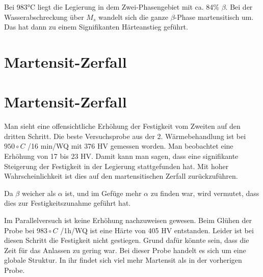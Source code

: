 Bei 983°C  liegt die Legierung in dem  Zwei-Phasengebiet mit ca. 84\% $\beta$. Bei der Wasserabschreckung über $M_s$ wandelt sich die ganze $\beta$-Phase martensitisch um. Das hat dann zu einem Signifikanten Härteanstieg geführt. 


\section{Martensit-Zerfall}

\section{Martensit-Zerfall}

Man sieht eine offensichtliche Erhöhung der Festigkeit vom Zweiten auf den dritten Schritt. Die beste Versuchsprobe aus der 2. Wärmebehandlung ist bei $950\circ C$ /16 min/WQ mit 376 HV gemessen worden. Man beobachtet eine Erhöhung von 17 bis 23 HV. Damit kann man sagen, dass eine signifikante Steigerung der Festigkeit in der Legierung stattgefunden hat. Mit hoher Wahrscheinlichkeit ist dies auf den martensitischen Zerfall zurückzuführen. 

Da $\beta$ weicher als $\alpha$ ist, und im Gefüge mehr $\alpha$ zu finden war, wird vermutet, dass dies zur Festigkeitszunahme geführt hat.

Im Parallelversuch ist keine Erhöhung nachzuweisen gewesen. Beim Glühen der Probe bei $983\circ C$ /1h/WQ ist eine Härte von 405 HV entstanden. Leider ist bei diesen Schritt die Festigkeit nicht gestiegen. Grund dafür könnte sein, dass die Zeit für das Anlassen zu gering war. Bei dieser Probe handelt es sich um eine globale Struktur. In ihr findet sich viel mehr Martensit als in der vorherigen Probe.


